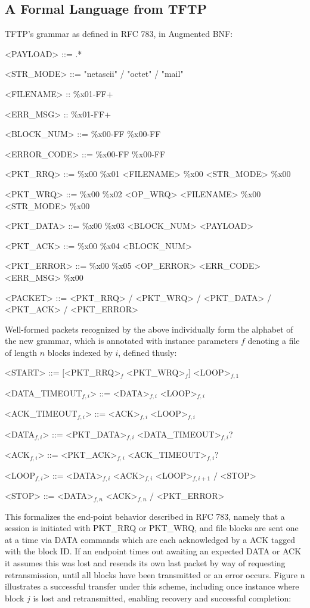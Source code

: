 \documentclass[a0,landscape]{a0poster}
\begin{document}
\begin{multicols}{4}
\section*{A Formal Language from TFTP}

TFTP's grammar as defined in RFC 783, in Augmented BNF:
\begin{grammar}
<PAYLOAD> ::= .*

<STR\_MODE> ::= "netascii" / "octet" / "mail"

<FILENAME> :: {\%x01-FF}+

<ERR\_MSG> :: {\%x01-FF}+

<BLOCK\_NUM> ::= \%x00-FF \%x00-FF

<ERROR\_CODE> ::= \%x00-FF \%x00-FF

<PKT\_RRQ> ::= \%x00 \%x01 <FILENAME> \%x00 <STR\_MODE> \%x00

<PKT\_WRQ> ::= \%x00 \%x02 <OP\_WRQ> <FILENAME> \%x00 <STR\_MODE> \%x00

<PKT\_DATA> ::= \%x00 \%x03 <BLOCK\_NUM> <PAYLOAD>

<PKT\_ACK> ::= \%x00 \%x04 <BLOCK\_NUM>

<PKT\_ERROR> ::= \%x00 \%x05 <OP\_ERROR> <ERR\_CODE> <ERR\_MSG> \%x00

<PACKET> ::= <PKT\_RRQ> / <PKT\_WRQ> / <PKT\_DATA> / <PKT\_ACK> / <PKT\_ERROR>
\end{grammar}

Well-formed packets recognized by the above individually form the alphabet of the new grammar, which is annotated with instance parameters $f$ denoting a file of length $n$ blocks indexed by $i$, defined thusly:

\begin{grammar}
<START> ::= $\big[$<PKT\_RRQ>$_{f}$ <PKT\_WRQ>$_{f}\big]$ <LOOP>$_{f,1}$

<DATA\_TIMEOUT$_{f,i}$> ::= <DATA>$_{f,i}$ <LOOP>$_{f,i}$

<ACK\_TIMEOUT$_{f,i}$> ::= <ACK>$_{f,i}$ <LOOP>$_{f,i}$

<DATA$_{f,i}$> ::= <PKT\_DATA>$_{f,i}$ <DATA\_TIMEOUT>$_{f,i}$?

<ACK$_{f,i}$> ::= <PKT\_ACK>$_{f,i}$ <ACK\_TIMEOUT>$_{f,i}$?

<LOOP$_{f,i}$> ::= <DATA>$_{f,i}$ <ACK>$_{f,i}$ <LOOP>$_{f,i+1}$ $\big/$ <STOP>

<STOP> ::= <DATA>$_{f,n}$ <ACK>$_{f,n}$ $\big/$ <PKT\_ERROR>
\end{grammar}

This formalizes the end-point behavior described in RFC 783, namely that a session is initiated with PKT\_RRQ or PKT\_WRQ, and file blocks are sent one at a time via DATA commands which are each acknowledged by a ACK tagged with the block ID. If an endpoint times out awaiting an expected DATA or ACK it assumes this was lost and resends its own last packet by way of requesting retransmission, until all blocks have been transmitted or an error occurs. Figure n illustrates a successful transfer under this scheme, including once instance where block $j$ is lost and retransmitted, enabling recovery and successful completion:


\end{multicols}
\end{document}
